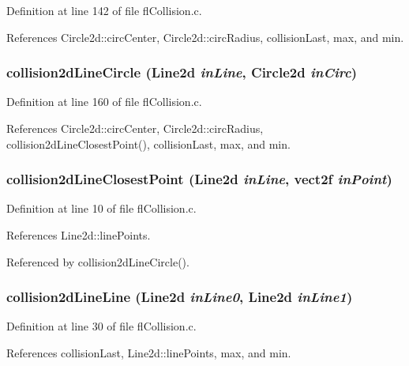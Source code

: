 Definition at line 142 of file fl\-Collision.c.

References Circle2d::circ\-Center, Circle2d::circ\-Radius, collision\-Last, max, and min.
\subsubsection{ collision2d\-Line\-Circle ({\bf Line2d} {\em in\-Line}, {\bf Circle2d} {\em in\-Circ})}\label{flCollision_8c_6aeb26d3a4760cd389a1fdd3a06ec498}




Definition at line 160 of file fl\-Collision.c.

References Circle2d::circ\-Center, Circle2d::circ\-Radius, collision2d\-Line\-Closest\-Point(), collision\-Last, max, and min.
\subsubsection{ collision2d\-Line\-Closest\-Point ({\bf Line2d} {\em in\-Line}, {\bf vect2f} {\em in\-Point})}\label{flCollision_8c_87cca69b4fc64de635bbd81da906c3ae}




Definition at line 10 of file fl\-Collision.c.

References Line2d::line\-Points.

Referenced by collision2d\-Line\-Circle().
\subsubsection{ collision2d\-Line\-Line ({\bf Line2d} {\em in\-Line0}, {\bf Line2d} {\em in\-Line1})}\label{flCollision_8c_0273e7aa05da48542d9a2dca76944955}




Definition at line 30 of file fl\-Collision.c.

References collision\-Last, Line2d::line\-Points, max, and min.
